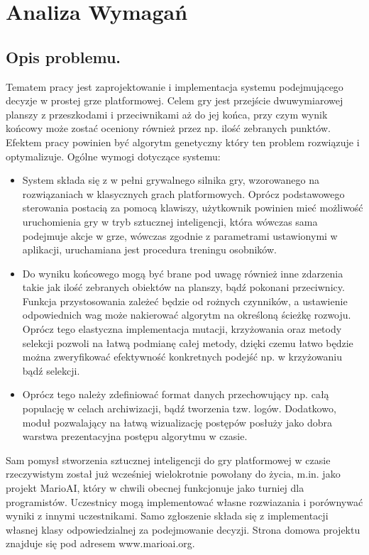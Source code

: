 \section{Analiza Wymagań}
\subsection{Opis problemu.}
\begin{par}
	Tematem pracy jest zaprojektowanie i implementacja systemu podejmującego decyzje w prostej grze platformowej.
	Celem gry jest przejście dwuwymiarowej planszy z przeszkodami i przeciwnikami aż do jej końca, przy czym wynik końcowy może
	zostać oceniony również przez np. ilość zebranych punktów.
	Efektem pracy powinien być algorytm genetyczny który ten problem rozwiązuje i optymalizuje.
	\newline
	Ogólne wymogi dotyczące systemu:
	\begin{itemize}
		\item
			System składa się z w pełni grywalnego silnika gry, wzorowanego na rozwiązaniach w klasycznych grach platformowych.
			Oprócz podstawowego sterowania postacią za pomocą klawiszy, użytkownik powinien mieć możliwość uruchomienia gry w tryb sztucznej inteligencji,
			która wówczas sama podejmuje akcje w grze, wówczas zgodnie z parametrami ustawionymi w aplikacji, uruchamiana jest procedura treningu osobników.
		\item
			Do wyniku końcowego mogą być brane pod uwagę również inne zdarzenia takie jak ilość zebranych obiektów na planszy, bądź 
			pokonani przeciwnicy.
			Funkcja przystosowania zależeć będzie od rożnych czynników, a ustawienie odpowiednich wag może nakierować algorytm na określoną ścieżkę rozwoju.
			Oprócz tego elastyczna implementacja mutacji, krzyżowania oraz metody selekcji pozwoli na łatwą podmianę całej metody, dzięki czemu łatwo będzie można zweryfikować
			efektywność konkretnych podejść np. w krzyżowaniu bądź selekcji.
		\item
			Oprócz tego należy zdefiniować format danych przechowujący np. całą populację w celach archiwizacji, bądź tworzenia tzw. logów. 
			Dodatkowo, moduł pozwalający na łatwą wizualizację postępów posłuży jako dobra warstwa prezentacyjna postępu algorytmu w czasie.
	\end{itemize}
\end{par}

\begin{par}
	Sam pomysł stworzenia sztucznej inteligencji do gry platformowej w czasie rzeczywistym został już wcześniej wielokrotnie powołany do życia, m.in. jako projekt MarioAI,
	który w chwili obecnej funkcjonuje jako turniej dla programistów. Uczestnicy mogą implementować własne rozwiazania i porównywać wyniki z innymi uczestnikami.
	Samo zgłoszenie składa się z implementacji własnej klasy odpowiedzialnej za podejmowanie decyzji.
	Strona domowa projektu znajduje się pod adresem www.marioai.org.
\end{par}

